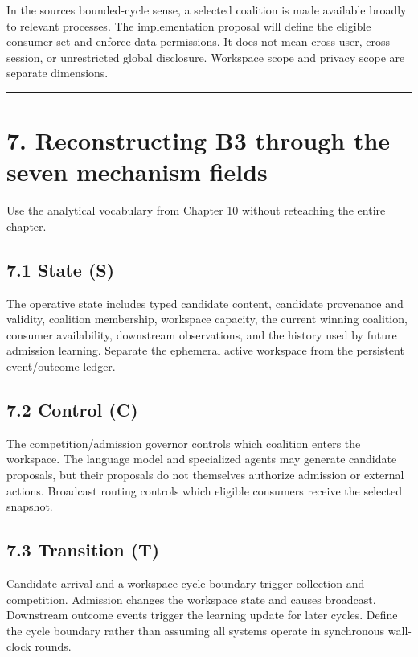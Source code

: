 In the source\textquotesingle s bounded-cycle sense, a selected coalition is made available broadly to relevant processes. The implementation proposal will define the eligible consumer set and enforce data permissions. It does not mean cross-user, cross-session, or unrestricted global disclosure. Workspace scope and privacy scope are separate dimensions.

\begin{center}\rule{0.5\linewidth}{0.5pt}\end{center}

\section{7. Reconstructing B3 through the seven mechanism fields}\label{7-reconstructing-b3-through-the-seven-mechanism-fields}

Use the analytical vocabulary from Chapter 10 without reteaching the entire chapter.

\subsection{7.1 State (S)}\label{71-state-s}

The operative state includes typed candidate content, candidate provenance and validity, coalition membership, workspace capacity, the current winning coalition, consumer availability, downstream observations, and the history used by future admission learning. Separate the ephemeral active workspace from the persistent event/outcome ledger.

\subsection{7.2 Control (C)}\label{72-control-c}

The competition/admission governor controls which coalition enters the workspace. The language model and specialized agents may generate candidate proposals, but their proposals do not themselves authorize admission or external actions. Broadcast routing controls which eligible consumers receive the selected snapshot.

\subsection{7.3 Transition (T)}\label{73-transition-t}

Candidate arrival and a workspace-cycle boundary trigger collection and competition. Admission changes the workspace state and causes broadcast. Downstream outcome events trigger the learning update for later cycles. Define the cycle boundary rather than assuming all systems operate in synchronous wall-clock rounds.

